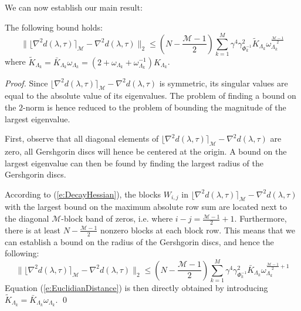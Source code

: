 We can now establish our main result:
\begin{lemma} \label{l:EuclidianDistance}
The following bound holds:
\begin{equation} \label{e:EuclidianDistance}
\| \lfloor \nabla^2 d(\lambda, \tau) \rceil_{\mathcal{M}} - \nabla^2 d(\lambda, \tau) \|_2 \leq \left( N -\frac{\mathcal{M} - 1}{2} \right) \sum_{k=1}^M \gamma^4 \gamma_{\Phi_k^{-1}}^2 \tilde{K}_{\Lambda_k} \omega_{\Lambda_k}^{\frac{\mathcal{M} - 1}{2}}
\end{equation}
where $\tilde{K}_{\Lambda_k} = \bar{K}_{\Lambda_k} \omega_{\Lambda_k} =  (2 + \omega_{\Lambda_k} + \omega_{\Lambda_k}^{-1}) K_{\Lambda_k}$.
\end{lemma}
\begin{proof}
Since $\lfloor \nabla^2 d(\lambda, \tau) \rceil_{\mathcal{M}} - \nabla^2 d(\lambda, \tau)$ is symmetric, its singular values are equal to the absolute value of its eigenvalues. The problem of finding a bound on the $2$-norm is hence reduced to the problem of bounding the magnitude of the largest eigenvalue.

First, observe that all diagonal elements of $\lfloor \nabla^2 d(\lambda, \tau) \rceil_{\mathcal{M}} - \nabla^2 d(\lambda, \tau)$ are zero, all Gershgorin discs will hence be centered at the origin. A bound on the largest eigenvalue can then be found by finding the largest radius of the Gershgorin discs.

According to (\ref{e:DecayHessian}), the blocks $W_{i,j}$ in $\lfloor \nabla^2 d(\lambda, \tau) \rceil_{\mathcal{M}} - \nabla^2 d(\lambda, \tau)$ with the largest bound on the maximum absolute row sum are located next to the diagonal $\mathcal{M}$-block band of zeros, i.e. where $i - j = \frac{\mathcal{M} - 1}{2} + 1$. Furthermore, there is at least $N -\frac{\mathcal{M} - 1}{2}$ nonzero blocks at each block row. This means that we can establish a bound on the radius of the Gershgorin discs, and hence the following:
\begin{equation} \label{e:BoundGershgorinRadius}
\| \lfloor \nabla^2 d(\lambda, \tau) \rceil_{\mathcal{M}} - \nabla^2 d(\lambda, \tau) \|_2 \leq \left( N -\frac{\mathcal{M} - 1}{2} \right) \sum_{k=1}^M \gamma^4 \gamma_{\Phi_k^{-1}}^2 \bar{K}_{\Lambda_k} \omega_{\Lambda_k}^{\frac{\mathcal{M} - 1}{2} + 1}
\end{equation}
Equation (\ref{e:EuclidianDistance}) is then directly obtained by introducing $\tilde{K}_{\Lambda_k} = \bar{K}_{\Lambda_k} \omega_{\Lambda_k}$.
\qed
\end{proof}

